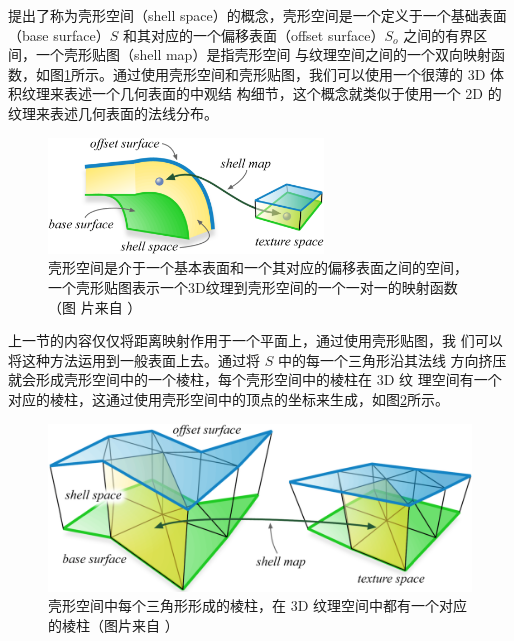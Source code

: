 \cite{a:Shell-Maps}提出了称为壳形空间（shell space）的概念，壳形空间是一个定义于一个基础表面（base surface）$S$ 和其对应的一个偏移表面（offset surface）$S_o$ 之间的有界区间，一个壳形贴图（shell map）是指壳形空间 与纹理空间之间的一个双向映射函数，如图\ref{f:df-shell-maps-1}所示。通过使用壳形空间和壳形贴图，我们可以使用一个很薄的 3D 体积纹理来表述一个几何表面的中观结 构细节，这个概念就类似于使用一个 2D 的纹理来表述几何表面的法线分布。

\begin{figure}
	\sidecaption
	\includegraphics[width=0.65\textwidth]{figures/df/shell-maps-1}
	\caption{壳形空间是介于一个基本表面和一个其对应的偏移表面之间的空间，一个壳形贴图表示一个3D纹理到壳形空间的一个一对一的映射函数（图 片来自 \cite{a:Shell-Maps}）}
	\label{f:df-shell-maps-1}
\end{figure}

上一节的内容仅仅将距离映射作用于一个平面上，通过使用壳形贴图，我 们可以将这种方法运用到一般表面上去。通过将 $S$ 中的每一个三角形沿其法线 方向挤压就会形成壳形空间中的一个棱柱，每个壳形空间中的棱柱在 3D 纹 理空间有一个对应的棱柱，这通过使用壳形空间中的顶点的坐标来生成，如图\ref{f:df-shell-maps-2}所示。

\begin{figure}
	\includegraphics[width=\textwidth]{figures/df/shell-maps-2}
	\caption{壳形空间中每个三角形形成的棱柱，在 3D 纹理空间中都有一个对应的棱柱（图片来自 \cite{a:Shell-Maps}）}
	\label{f:df-shell-maps-2}
\end{figure}

